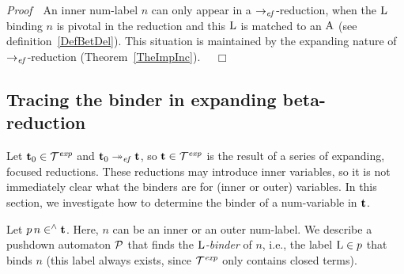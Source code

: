 \documentclass[submission,copyright,creativecommons]{eptcs}
\begin{document}
{\it Proof\/}~~An inner num-label $n$ can only appear in a $\rightarrow_{\it ef}$-reduction, when the ${\rm L}$ binding $n$ is pivotal in the reduction and this ${\rm L}$ is matched to an ${\rm A}$ (see definition~\ref{DefBetDel}). This situation is maintained by the expanding nature of $\rightarrow_{\it ef}$-reduction (Theorem~\ref{TheImpInc}). ~~$\Box$






\subsection{Tracing the binder in expanding beta-reduction}\label{SecTra}

Let ${\bf t}_0 \in {\cal T}^{\it exp}$ and ${\bf t}_0 \twoheadrightarrow_{\it ef} {\bf t}$, so ${\bf t} \in {\cal T}^{\it exp}$ is the result of a series of expanding, focused reductions. These reductions may introduce inner variables, so it is not immediately clear what the binders are for (inner or outer) variables. In this section, we investigate how to determine the binder of a num-variable in ${\bf t}$.

\smallskip

Let $p \, n \in^{\wedge} {\bf t}$. Here, $n$ can be an inner or an outer num-label. We describe a pushdown automaton ${\cal P}$ that finds the {\em ${\rm L}$-binder} of $n$, i.e., the label ${\rm L} \in p$ that binds $n$ (this label always exists, since ${\cal T}^{\it exp}$ only contains closed terms).

\smallskip






\end{document}
